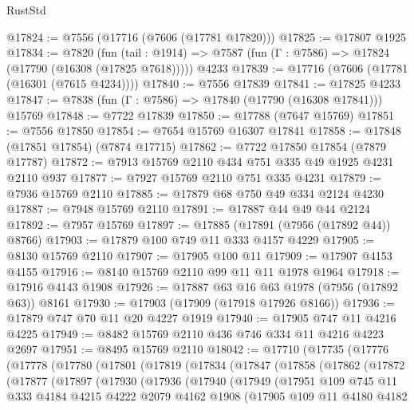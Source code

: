 \begin{lexlean}{RustStd}
\begin{coremodule}
@17824 := @7556 (@17716 (@7606 (@17781 @17820)))
@17825 := @17807 @1925
@17834 := @7820
    (fun (tail : @1914) => @7587 (fun (Γ : @7586) => @17824 (@17790 (@16308 (@17825 @7618)))))
    @4233
@17839 := @17716 (@7606 (@17781 (@16301 (@7615 @4234))))
@17840 := @7556 @17839
@17841 := @17825 @4233
@17847 := @7838 (fun (Γ : @7586) => @17840 (@17790 (@16308 @17841))) @15769
@17848 := @7722 @17839
@17850 := @17788 (@7647 @15769)
@17851 := @7556 @17850
@17854 := @7654 @15769 @16307 @17841
@17858 := @17848 (@17851 @17854) (@7874 @17715)
@17862 := @7722 @17850 @17854 (@7879 @17787)
@17872 := @7913 @15769 @2110 @434 @751 @335 @49 @1925 @4231 @2110 @937
@17877 := @7927 @15769 @2110 @751 @335 @4231
@17879 := @7936 @15769 @2110
@17885 := @17879 @68 @750 @49 @334 @2124 @4230
@17887 := @7948 @15769 @2110
@17891 := @17887 @44 @49 @44 @2124
@17892 := @7957 @15769
@17897 := @17885 (@17891 (@7956 (@17892 @44)) @8766)
@17903 := @17879 @100 @749 @11 @333 @4157 @4229
@17905 := @8130 @15769 @2110
@17907 := @17905 @100 @11
@17909 := @17907 @4153 @4155
@17916 := @8140 @15769 @2110 @99 @11 @11 @1978 @1964
@17918 := @17916 @4143 @1908
@17926 := @17887 @63 @16 @63 @1978 (@7956 (@17892 @63)) @8161
@17930 := @17903 (@17909 (@17918 @17926 @8166))
@17936 := @17879 @747 @70 @11 @20 @4227 @1919
@17940 := @17905 @747 @11 @4216 @4225
@17949 := @8482 @15769 @2110 @436 @746 @334 @11 @4216 @4223 @2697
@17951 := @8495 @15769 @2110
@18042 := @17710
    (@17735
      (@17776
        (@17778
          (@17780
            (@17801
              (@17819
                (@17834
                  (@17847
                    (@17858
                      (@17862
                        (@17872
                          (@17877
                            (@17897
                              (@17930
                                (@17936
                                  (@17940
                                    (@17949
                                      (@17951
                                        @109
                                        @745
                                        @11
                                        @333
                                        @4184
                                        @4215
                                        @4222
                                        @2079
                                        @4162
                                        @1908
                                        (@17905
                                          @109
                                          @11
                                          @4180
                                          @4182

\end{coremodule}
\end{lexlean}
